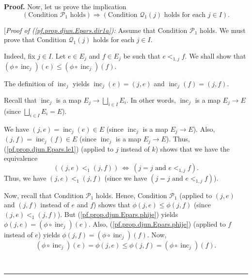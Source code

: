 \documentclass[numbers=enddot,12pt,final,onecolumn,notitlepage,abstracton]{scrartcl}
\theoremstyle{definition}
\newenvironment{proof}[1][Proof]{\noindent\textbf{#1.} }{\ \rule{0.5em}{0.5em}}
\newenvironment{verlong}{}{}
\begin{document}
\begin{verlong}
\begin{footnotesize}
\begin{proof}
Now, let us prove the implication%
\begin{equation}
\left(  \text{Condition }\mathcal{P}_{1}\text{ holds}\right)  \Longrightarrow
\left(  \text{Condition }\mathcal{Q}_{1}\left(  j\right)  \text{ holds for
each }j\in I\right)  . \label{pf.prop.djun.Epars.dir1a}%
\end{equation}


[\textit{Proof of (\ref{pf.prop.djun.Epars.dir1a}):} Assume that Condition
$\mathcal{P}_{1}$ holds. We must prove that Condition $\mathcal{Q}_{1}\left(
j\right)  $ holds for each $j\in I$.

Indeed, fix $j\in I$. Let $e\in E_{j}$ and $f\in E_{j}$ be such that
$e<_{1,j}f$. We shall show that $\left(  \phi\circ\operatorname*{inc}%
\nolimits_{j}\right)  \left(  e\right)  \leq\left(  \phi\circ
\operatorname*{inc}\nolimits_{j}\right)  \left(  f\right)  $.

The definition of $\operatorname*{inc}\nolimits_{j}$ yields
$\operatorname*{inc}\nolimits_{j}\left(  e\right)  =\left(  j,e\right)  $ and
$\operatorname*{inc}\nolimits_{j}\left(  f\right)  =\left(  j,f\right)  $.

Recall that $\operatorname*{inc}\nolimits_{j}$ is a map $E_{j}\rightarrow
\bigsqcup_{i\in I}E_{i}$. In other words, $\operatorname*{inc}\nolimits_{j}$
is a map $E_{j}\rightarrow E$ (since $\bigsqcup_{i\in I}E_{i}=E$).

We have $\left(  j,e\right)  =\operatorname*{inc}\nolimits_{j}\left(
e\right)  \in E$ (since $\operatorname*{inc}\nolimits_{j}$ is a map
$E_{j}\rightarrow E$). Also, $\left(  j,f\right)  =\operatorname*{inc}%
\nolimits_{j}\left(  f\right)  \in E$ (since $\operatorname*{inc}%
\nolimits_{j}$ is a map $E_{j}\rightarrow E$). Thus,
(\ref{pf.prop.djun.Epars.le1}) (applied to $j$ instead of $k$) shows that we
have the equivalence%
\[
\left(  \left(  j,e\right)  <_{1}\left(  j,f\right)  \right)
\ \Longleftrightarrow\ \left(  j=j\text{ and }e<_{1,j}f\right)  .
\]
Thus, we have $\left(  j,e\right)  <_{1}\left(  j,f\right)  $ (since we have
$\left(  j=j\text{ and }e<_{1,j}f\right)  $).

Now, recall that Condition $\mathcal{P}_{1}$ holds. Hence, Condition
$\mathcal{P}_{1}$ (applied to $\left(  j,e\right)  $ and $\left(  j,f\right)
$ instead of $e$ and $f$) shows that $\phi\left(  j,e\right)  \leq\phi\left(
j,f\right)  $ (since $\left(  j,e\right)  <_{1}\left(  j,f\right)  $). But
(\ref{pf.prop.djun.Epars.phije}) yields $\phi\left(  j,e\right)  =\left(
\phi\circ\operatorname*{inc}\nolimits_{j}\right)  \left(  e\right)  $. Also,
(\ref{pf.prop.djun.Epars.phije}) (applied to $f$ instead of $e$) yields
$\phi\left(  j,f\right)  =\left(  \phi\circ\operatorname*{inc}\nolimits_{j}%
\right)  \left(  f\right)  $. Now,%
\[
\left(  \phi\circ\operatorname*{inc}\nolimits_{j}\right)  \left(  e\right)
=\phi\left(  j,e\right)  \leq\phi\left(  j,f\right)  =\left(  \phi
\circ\operatorname*{inc}\nolimits_{j}\right)  \left(  f\right)  .
\]



\end{proof}
\end{footnotesize}
\end{verlong}
\end{document}
